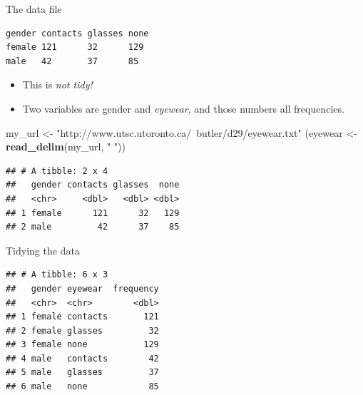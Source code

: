 \documentclass[
  ignorenonframetext,
]{beamer}
\newenvironment{Shaded}{\begin{snugshade}}{\end{snugshade}}
\newcommand{\DataTypeTok}[1]{\textcolor[rgb]{0.13,0.29,0.53}{#1}}
\newcommand{\KeywordTok}[1]{\textcolor[rgb]{0.13,0.29,0.53}{\textbf{#1}}}
\newcommand{\NormalTok}[1]{#1}
\newcommand{\OperatorTok}[1]{\textcolor[rgb]{0.81,0.36,0.00}{\textbf{#1}}}
\newcommand{\StringTok}[1]{\textcolor[rgb]{0.31,0.60,0.02}{#1}}
\begin{document}
\begin{frame}[fragile]{The data file}
\protect\hypertarget{the-data-file}{}

\footnotesize

\begin{verbatim}
gender contacts glasses none
female 121      32      129
male   42       37      85
\end{verbatim}

\normalsize

\begin{itemize}
\item
  This is \emph{not tidy!}
\item
  Two variables are gender and \emph{eyewear}, and those numbers all
  frequencies.
\end{itemize}

\footnotesize

\begin{Shaded}
\begin{Highlighting}[]
\NormalTok{my_url <-}\StringTok{ "http://www.utsc.utoronto.ca/~butler/d29/eyewear.txt"}
\NormalTok{(eyewear <-}\StringTok{ }\KeywordTok{read_delim}\NormalTok{(my_url, }\StringTok{" "}\NormalTok{))}
\end{Highlighting}
\end{Shaded}

\begin{verbatim}
## # A tibble: 2 x 4
##   gender contacts glasses  none
##   <chr>     <dbl>   <dbl> <dbl>
## 1 female      121      32   129
## 2 male         42      37    85
\end{verbatim}

\normalsize

\end{frame}

\begin{frame}[fragile]{Tidying the data}
\protect\hypertarget{tidying-the-data}{}

\begin{Shaded}
\end{Shaded}

\begin{verbatim}
## # A tibble: 6 x 3
##   gender eyewear  frequency
##   <chr>  <chr>        <dbl>
## 1 female contacts       121
## 2 female glasses         32
## 3 female none           129
## 4 male   contacts        42
## 5 male   glasses         37
## 6 male   none            85
\end{verbatim}

\end{frame}
\end{document}
